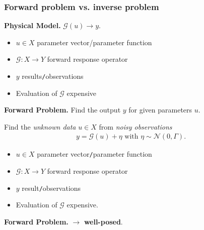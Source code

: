 \documentclass[oneside]{article}
\numberwithin{equation}{section}
\begin{document}
\subsubsection{Forward problem vs. inverse problem}
\textbf{Physical Model.} $\mathcal{G}(u)\to y$.
\begin{itemize}
    \item $u\in X$ parameter vector/parameter function
    \item $\mathcal{G}:X\to Y$ forward response operator
    \item $y$ results\texttt{/}observations
    \item Evaluation of $\mathcal{G}$ expensive
\end{itemize}
\textbf{Forward Problem.} Find the output $y$ for given parameters $u$.

%
Find the \textit{unknown data} $u\in X$ from \textit{noisy observations}
\begin{align*}
    y = \mathcal{G}(u) + \eta \mbox{ with } \eta\sim\mathcal{N}(0,\Gamma).
\end{align*}
\begin{itemize}
    \item $u\in X$ parameter vector\texttt{/}parameter function
    \item $\mathcal{G}:X\to Y$ forward response operator
    \item $y$ result\texttt{/}observations
    \item Evaluation of $\mathcal{G}$ expensive.
\end{itemize}

\textbf{Forward Problem.}  $\to$ \textbf{well-posed}.
\end{document}
